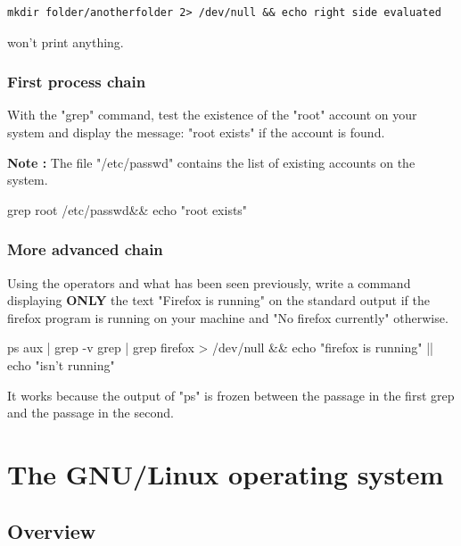 \documentclass[11pt]{article}
\begin{document}
\begin{lstlisting}
mkdir folder/anotherfolder 2> /dev/null && echo right side evaluated
\end{lstlisting}
won't print anything.

\subsubsection{First process chain}

With the "grep" command, test the existence of the "root" account on your system and display the message: "root exists" if the account is found.

\textbf{Note :} The file "/etc/passwd" contains the list of existing accounts on the system.

\begin{solution}
grep root /etc/passwd\&\& echo "root exists"
\end{solution}

\subsubsection{More advanced chain}
Using the operators and what has been seen previously, write a command displaying \textbf{ONLY} the text "Firefox is running" on the standard output if the firefox program is running on your machine and "No firefox currently" otherwise.


\begin{solution}
ps aux | grep -v grep | grep firefox > /dev/null \&\& echo "firefox is running" || echo "isn't running"

It works because the output of "ps" is frozen between the passage in the first grep and the passage in the second.

\end{solution}

\section{The GNU/Linux operating system}

\subsection{Overview}
\end{document}
